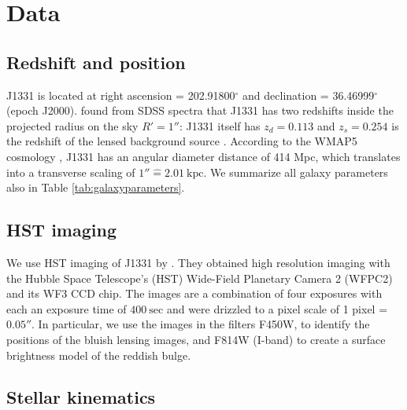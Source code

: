 \documentclass[useAMS,usenatbib]{mnras}
\begin{document}

\section{Data} \label{sec:data}

\subsection{Redshift and position}

J1331 is located at right ascension = 202.91800$^\circ$ and declination = 36.46999$^\circ$ (epoch J2000). \citet{SWELLSI} found from SDSS spectra that J1331 has two redshifts inside the projected radius on the sky $R'=1''$: J1331 itself has $z_d = 0.113$ and $z_s = 0.254$ is the redshift of the lensed background source \citep{SWELLSIII}. According to the WMAP5 cosmology \citep{WMAP5cosm}, J1331 has an angular diameter distance of 414 Mpc, which translates into a transverse scaling of $1'' \hat{=} 2.01~\text{kpc}$. We summarize all galaxy parameters also in Table \ref{tab:galaxyparameters}.

\subsection{HST imaging}

We use HST imaging of J1331 by \citet{SWELLSI}. They obtained high resolution imaging with the Hubble Space Telescope's (HST) Wide-Field Planetary Camera 2 (WFPC2) and its WF3 CCD chip. The images are a combination of four exposures with each an exposure time of $400~\text{sec}$ and were drizzled to a pixel scale of 1 pixel = $0.05''$. In particular, we use the images in the filters F450W, to identify the positions of the bluish lensing images, and F814W (I-band) to create a surface brightness model of the reddish bulge.

\subsection{Stellar kinematics} \label{sec:data_kinematics}
\end{document}
